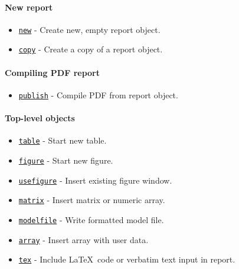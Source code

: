 

	\paragraph{New report}\label{new-report}

\begin{itemize}
\itemsep1pt\parskip0pt
\item
  \href{report/new}{\texttt{new}} - Create new, empty report object.
\item
  \href{report/copy}{\texttt{copy}} - Create a copy of a report object.
\end{itemize}

\paragraph{Compiling PDF report}\label{compiling-pdf-report}

\begin{itemize}
\itemsep1pt\parskip0pt
\item
  \href{report/publish}{\texttt{publish}} - Compile PDF from report
  object.
\end{itemize}

\paragraph{Top-level objects}\label{top-level-objects}

\begin{itemize}
\itemsep1pt\parskip0pt
\item
  \href{report/table}{\texttt{table}} - Start new table.
\item
  \href{report/figure}{\texttt{figure}} - Start new figure.
\item
  \href{report/userfigure}{\texttt{usefigure}} - Insert existing figure
  window.
\item
  \href{report/matrix}{\texttt{matrix}} - Insert matrix or numeric
  array.
\item
  \href{report/modelfile}{\texttt{modelfile}} - Write formatted model
  file.
\item
  \href{report/array}{\texttt{array}} - Insert array with user data.
\item
  \href{report/tex}{\texttt{tex}} - Include \LaTeX~code or verbatim text
  input in report.
\end{itemize}

